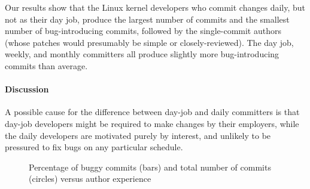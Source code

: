 Our results show that the Linux kernel developers who commit changes daily, but
not as their day job, produce the largest number of commits and the smallest
number of bug-introducing commits, followed by the single-commit authors (whose
patches would presumably be simple or closely-reviewed). The day job, weekly,
and monthly committers all produce slightly more bug-introducing commits than
average.

\paragraph{Discussion}

A possible cause for the difference between day-job and daily committers is that
day-job developers might be required to make changes by their employers, while
the daily developers are motivated purely by interest, and unlikely to be
pressured to fix bugs on any particular schedule.

\begin{figure}[tbh]
\centering
{}
\caption{\label{fig-bugginess-experience}Percentage of buggy commits (bars) and total number of commits (circles) versus author experience}
\end{figure}

